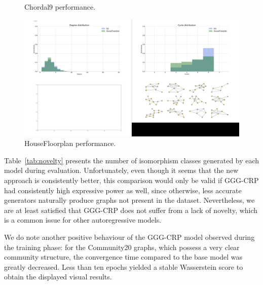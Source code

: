 \begin{figure}[!ht]
\begin{minipage}{0.475\textwidth}
    \caption[GGG-CRP performance on Chordal9.]{Chordal9 performance.}
    \label{fig:chordal9}    
    \end{minipage}
    \hfill
    \begin{minipage}{0.475\textwidth}
    \centering
    \includegraphics[width=\textwidth]{figures/gggcrp/Housefloorplan.pdf}
    \caption[GGG-CRP performance on HouseFloorplan.]{HouseFloorplan performance.}
    \label{fig:house}    
    \end{minipage}
\end{figure}
Table~\ref{tab:novelty} presents the number of isomorphism classes generated by each model during evaluation. Unfortunately, even though it seems that the new approach is consistently better, this comparison would only be valid if GGG-CRP had consistently high expressive power as well, since otherwise, less accurate generators naturally produce graphs not present in the dataset. Nevertheless, we are at least satisfied that GGG-CRP does not suffer from a lack of novelty, which is a common issue for other autoregressive models.
\begin{table}[H]
\centering
\caption[Comparison of novelty and diversity between GG-GAN and GGG-CRP.]{Comparison of novelty and diversity between GG-GAN and GGG-CRP. A higher number of isomorphism classes denotes better performance.}
\label{tab:novelty}
\end{table}
We do note another positive behaviour of the GGG-CRP model observed during the training phase: for the Community20 graphs, which possess a very clear community structure, the convergence time compared to the base model was greatly decreased. Less than ten epochs yielded a stable Wasserstein score to obtain the displayed visual results. 

